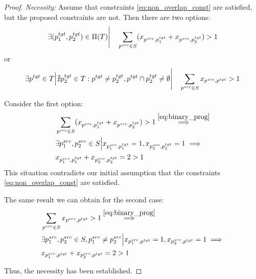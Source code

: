 \begin{proof}
  \textit{Necessity:} Assume that constraints \eqref{eq:non_overlap_const} are satisfied, but
  the proposed constraints are not. Then there are two options:
  \[
    \exists (p_1^{tgt}, p_2^{tgt}) \in \Pi(T) \Bigg| \quad
    \sum\limits_{p^{src} \in S} (x_{p^{src}, p_1^{tgt}} + x_{p^{src}, p_2^{tgt}}) > 1
  \]
  or
  \[
    \exists p^{tgt} \in T \Big|
    \nexists p_2^{tgt} \in T: p^{tgt} \neq p_2^{tgt}, p^{tgt} \cap p_2^{tgt} \neq \emptyset
    \Bigg| \quad \sum\limits_{p^{src} \in S} x_{p^{src}, p^{tgt}} > 1
  \]

  Consider the first option:
  \begin{align*}
    & \sum\limits_{p^{src} \in S} (x_{p^{src}, p_1^{tgt}} + x_{p^{src}, p_2^{tgt}}) > 1
    \stackrel{\eqref{eq:binary_prog}}{\implies}                                                                     \\
    & \exists p_1^{src}, p_2^{src} \in S \Big| x_{p_1^{src}, p_1^{tgt}} = 1, x_{p_2^{src}, p_2^{tgt}} = 1 \implies \\
    & x_{p_1^{src}, p_1^{tgt}} + x_{p_2^{src}, p_2^{tgt}} = 2 > 1
  \end{align*}
  This situation contradicts our initial assumption that the constraints \eqref{eq:non_overlap_const} are satisfied.

  The same result we can obtain for the second case:
  \begin{align*}
    & \sum\limits_{p^{src} \in S} x_{p^{src}, p^{tgt}} > 1
    \stackrel{\eqref{eq:binary_prog}}{\implies}                                                                                           \\
    & \exists p_1^{src}, p_2^{src} \in S, p_1^{src} \neq p_2^{src} \Big| x_{p_1^{src}, p^{tgt}} = 1, x_{p_2^{src}, p^{tgt}} = 1 \implies \\
    & x_{p_1^{src}, p^{tgt}} + x_{p_2^{src}, p^{tgt}} = 2 > 1
  \end{align*}

  Thus, the necessity has been established.


\end{proof}
